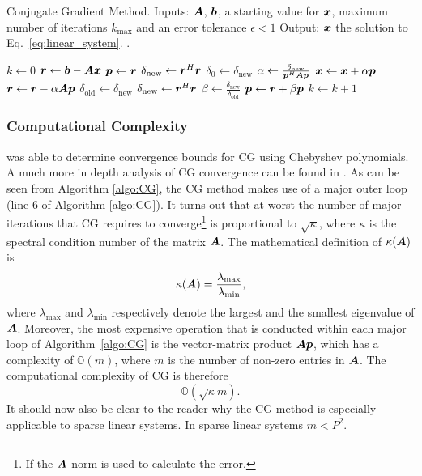 \documentclass[useAMS,usenatbib]{mn2e}
\newcommand{\bA}{\bmath{A}}
\newcommand{\br}{\bmath{r}}
\newcommand{\bb}{\bmath{b}}
\newcommand{\bx}{\bmath{x}}
\newcommand{\bp}{\bmath{p}}
\begin{document}

\begin{algorithm}
\caption{Conjugate Gradient Method. Inputs: $\bA$, $\bb$, a starting value for $\bx$, maximum number of iterations $k_{\textrm{max}}$ and an error tolerance $\epsilon<1$ Output: $\bx$ the solution to Eq.~\eqref{eq:linear_system}. \citep{Shewchuk1994}.}\label{algo:CG}
\begin{algorithmic}[1]
\State $k \gets 0$
\State $\br \gets \bb - \bA\bx$
\State $\bp \gets \br$
\State $\delta_{\textrm{new}} \gets \br^H\br$
\State $\delta_0 \gets \delta_{\textrm{new}}$
\State $\alpha \gets \frac{\delta_{\textrm{new}}}{\bp^H\bA\bp}$
\State $\bx \gets \bx + \alpha\bp$
\State $\br \gets \br - \alpha\bA\bp$
\State $\delta_{\textrm{old}} \gets \delta_{\textrm{new}}$ 
\State $\delta_{\textrm{new}} \gets \br^H\br$
\State $\beta \gets \frac{\delta_{\textrm{new}}}{\delta_{\textrm{old}}}$
\State $\bp \gets \br + \beta\bp$
\State $k \gets k + 1$
\EndWhile
\end{algorithmic}
\end{algorithm}

\subsubsection{Computational Complexity}
\citet{Kaniel1966} was able to determine convergence bounds for CG using Chebyshev polynomials. A much more in depth analysis of CG convergence can be found in
\citep{Sluis1986}. As can be seen from Algorithm \ref{algo:CG}, the CG method makes use of a major outer loop (line 6 of Algorithm \ref{algo:CG}). It turns out that at worst 
the number of major iterations that CG requires to converge\footnote{If the $\bA$-norm is used to calculate the error.} is proportional to $\sqrt{\kappa}$, where $\kappa$ is the spectral condition number of the matrix $\bA$.
The mathematical definition of $\kappa(\bA)$ is
\begin{equation}
\label{eq:kappa}
\kappa(\bA) = \frac{\lambda_{\textrm{max}}}{\lambda_{\textrm{min}}}, 
\end{equation}
where $\lambda_{\textrm{max}}$ and $\lambda_{\textrm{min}}$ respectively denote the largest and the smallest eigenvalue of $\bA$.
Moreover, the most expensive operation that is conducted within each major loop of Algorithm~\ref{algo:CG} is the vector-matrix product $\bA\bp$, which has a complexity of $\mathbb{O}(m)$, where $m$ is the number of non-zero entries in $\bA$.
The computational complexity of CG is therefore 
\begin{equation}
\label{eq:cg_bound}
\mathbb{O}(\sqrt{\kappa}m). 
\end{equation}
It should now also be clear to the reader why the CG method is especially applicable to sparse linear systems. In sparse linear systems $m < P^2$.
\end{document}
